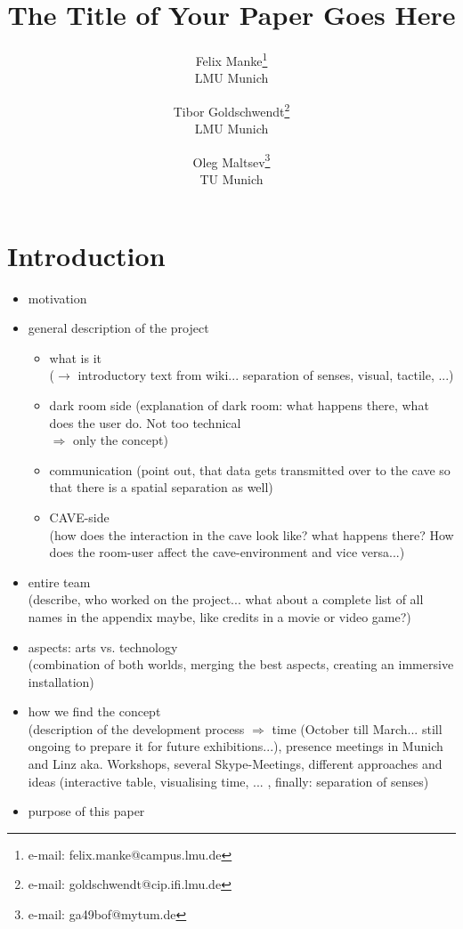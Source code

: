 \documentclass[conference]{acmsiggraph}
\title{The Title of Your Paper Goes Here}
\author{
	Felix Manke\thanks{e-mail: felix.manke@campus.lmu.de}\\LMU Munich
	\and
	Tibor Goldschwendt\thanks{e-mail: goldschwendt@cip.ifi.lmu.de}\\LMU Munich
	\and
	Oleg Maltsev\thanks{e-mail: ga49bof@mytum.de}\\TU Munich
}
\begin{document}

\maketitle



\begin{abstract}

\end{abstract}

\copyrightspace





\section{Introduction}

\begin{itemize}
\item motivation
\item{
	general description of the project
	\begin{itemize}
	\item what is it\\
	 ($\rightarrow$ introductory text from wiki... separation of senses, visual, tactile, ...)
	\item dark room side (explanation of dark room: what happens there, what does the user do. Not too technical\\
	 $\Rightarrow$ only the concept)
	\item communication
	(point out, that data gets transmitted over to the cave so that there is a spatial separation as well)
	\item CAVE-side\\
	(how does the interaction in the cave look like? what happens there? How does the room-user affect the cave-environment and vice versa...)
	\end{itemize}
}
\item entire team\\
	  (describe, who worked on the project... what about a complete list of all names in the appendix maybe, like credits in a movie or video game?)
\item aspects: arts vs. technology\\
		(combination of both worlds, merging the best aspects, creating an immersive installation)
\item how we find the concept\\
		(description of the development process $\Rightarrow$ time (October till March... still ongoing to prepare it for future exhibitions...), presence meetings in Munich and Linz aka. Workshops, several Skype-Meetings, different approaches and ideas (interactive table, visualising time, ... , finally: separation of senses) 
\item purpose of this paper
\end{itemize}
\end{document}
